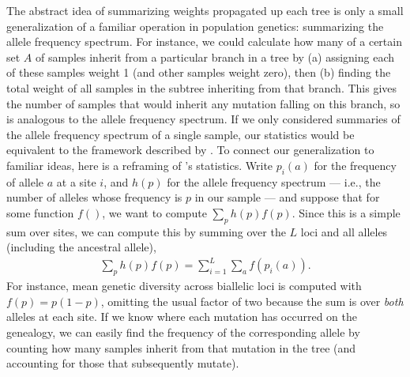 \documentclass{article}
\begin{document}
The abstract idea of summarizing weights propagated up each tree
is only a small generalization of a familiar operation in population genetics:
summarizing the allele frequency spectrum.
For instance, we could calculate how many of a certain set $A$ of samples
inherit from a particular branch in a tree
by (a) assigning each of these samples weight 1 (and other samples weight zero), then
(b) finding the total weight of all samples in the subtree inheriting from that branch.
This gives the number of samples that would inherit any mutation falling on this branch,
so is analogous to the allele frequency spectrum.
If we only considered summaries of the allele frequency spectrum of a single sample,
our statistics would be equivalent to the framework described by \citet{fu1995statistical}.
To connect our  generalization to familiar ideas,
here is a reframing of \citeauthor{fu1995statistical}'s statistics.
Write $p_i(a)$ for the frequency of allele $a$ at a site $i$,
and $h(p)$ for the allele frequency spectrum
--- i.e., the number of alleles whose frequency is $p$ in our sample ---
and suppose that for some function $f()$, we want to compute $\sum_p h(p) f(p)$.
Since this is a simple sum over sites,
we can compute this by summing over the $L$ loci and all alleles
(including the ancestral allele),
\begin{align*}
    \sum_p h(p) f(p) = \sum_{i=1}^L \sum_a f(p_i(a)).
\end{align*}
For instance, mean genetic diversity across biallelic loci is computed with $f(p) = p (1-p)$,
omitting the usual factor of two because the sum is over \emph{both} alleles at each site.
If we know where each mutation has occurred on the genealogy,
we can easily find the frequency of the corresponding allele by counting how many samples
inherit from that mutation in the tree (and accounting for those that subsequently mutate).
\end{document}
